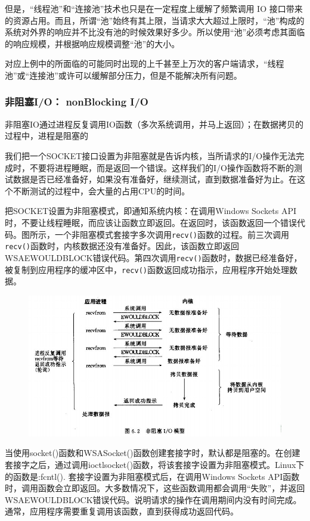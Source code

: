 \documentclass[UTF8,a4paper,8pt]{ctexbook}
\begin{document}
			但是，“线程池”和“连接池”技术也只是在一定程度上缓解了频繁调用 IO 接口带来的资源占用。而且，所谓“池”始终有其上限，当请求大大超过上限时，“池”构成的系统对外界的响应并不比没有池的时候效果好多少。所以使用“池”必须考虑其面临的响应规模，并根据响应规模调整“池”的大小。
			
			对应上例中的所面临的可能同时出现的上千甚至上万次的客户端请求，“线程池”或“连接池”或许可以缓解部分压力，但是不能解决所有问题。
			
			\subsubsection{非阻塞I/O： nonBlocking I/O}
			非阻塞IO通过进程反复调用IO函数（多次系统调用，并马上返回）；在数据拷贝的过程中，进程是阻塞的
			
			我们把一个SOCKET接口设置为非阻塞就是告诉内核，当所请求的I/O操作无法完成时，不要将进程睡眠，而是返回一个错误。这样我们的I/O操作函数将不断的测试数据是否已经准备好，如果没有准备好，继续测试，直到数据准备好为止。在这个不断测试的过程中，会大量的占用CPU的时间。
			
			把SOCKET设置为非阻塞模式，即通知系统内核：在调用Windows Sockets API时，不要让线程睡眠，而应该让函数立即返回。在返回时，该函数返回一个错误代码。图所示，一个非阻塞模式套接字多次调用\verb|recv()|函数的过程。前三次调用\verb|recv()|函数时，内核数据还没有准备好。因此，该函数立即返回WSAEWOULDBLOCK错误代码。第四次调用\verb|recv()|函数时，数据已经准备好，被复制到应用程序的缓冲区中，\verb|recv()|函数返回成功指示，应用程序开始处理数据。
			
			\begin{figure}[h]
				\centering
				\includegraphics[scale = 0.8]{nonBlockingIO.jpg}
			\end{figure}
			
			当使用socket()函数和WSASocket()函数创建套接字时，默认都是阻塞的。在创建套接字之后，通过调用ioctlsocket()函数，将该套接字设置为非阻塞模式。Linux下的函数是:fcntl().
			套接字设置为非阻塞模式后，在调用Windows Sockets API函数时，调用函数会立即返回。大多数情况下，这些函数调用都会调用“失败”，并返回WSAEWOULDBLOCK错误代码。说明请求的操作在调用期间内没有时间完成。通常，应用程序需要重复调用该函数，直到获得成功返回代码。
			
\end{document}
